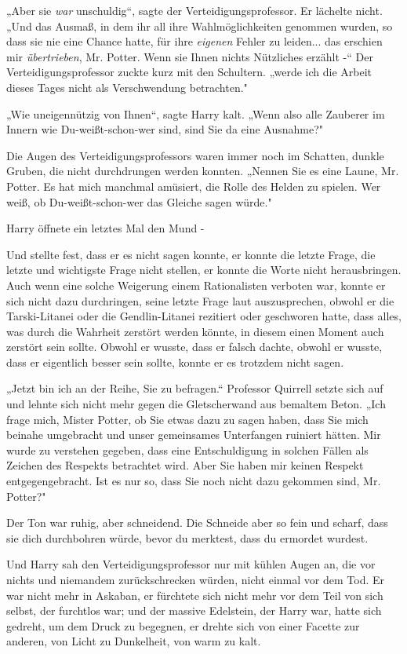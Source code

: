 {„Aber sie \emph{war} unschuldig“, sagte der Verteidigungsprofessor. Er lächelte nicht. „Und das Ausmaß, in dem ihr all ihre Wahlmöglichkeiten genommen wurden, so dass sie nie eine Chance hatte, für ihre \emph{eigenen} Fehler zu leiden... das erschien mir \emph{übertrieben}, Mr. Potter. Wenn sie Ihnen nichts Nützliches erzählt -“ Der Verteidigungsprofessor zuckte kurz mit den Schultern. „werde ich die Arbeit dieses Tages nicht als Verschwendung betrachten."

„Wie uneigennützig von Ihnen“, sagte Harry kalt. „Wenn also alle Zauberer im Innern wie Du-weißt-schon-wer sind, sind Sie da eine Ausnahme?"

Die Augen des Verteidigungsprofessors waren immer noch im Schatten, dunkle Gruben, die nicht durchdrungen werden konnten. „Nennen Sie es eine Laune, Mr. Potter. Es hat mich manchmal amüsiert, die Rolle des Helden zu spielen. Wer weiß, ob Du-weißt-schon-wer das Gleiche sagen würde."

Harry öffnete ein letztes Mal den Mund -

Und stellte fest, dass er es nicht sagen konnte, er konnte die letzte Frage, die letzte und wichtigste Frage nicht stellen, er konnte die Worte nicht herausbringen. Auch wenn eine solche Weigerung einem Rationalisten verboten war, konnte er sich nicht dazu durchringen, seine letzte Frage laut auszusprechen, obwohl er die Tarski-Litanei oder die Gendlin-Litanei rezitiert oder geschworen hatte, dass alles, was durch die Wahrheit zerstört werden könnte, in diesem einen Moment auch zerstört sein sollte. Obwohl er wusste, dass er falsch dachte, obwohl er wusste, dass er eigentlich besser sein sollte, konnte er es trotzdem nicht sagen.

„Jetzt bin ich an der Reihe, Sie zu befragen.“ Professor Quirrell setzte sich auf und lehnte sich nicht mehr gegen die Gletscherwand aus bemaltem Beton. „Ich frage mich, Mister Potter, ob Sie etwas dazu zu sagen haben, dass Sie mich beinahe umgebracht und unser gemeinsames Unterfangen ruiniert hätten. Mir wurde zu verstehen gegeben, dass eine Entschuldigung in solchen Fällen als Zeichen des Respekts betrachtet wird. Aber Sie haben mir keinen Respekt entgegengebracht. Ist es nur so, dass Sie noch nicht dazu gekommen sind, Mr. Potter?"

Der Ton war ruhig, aber schneidend. Die Schneide aber so fein und scharf, dass sie dich durchbohren würde, bevor du merktest, dass du ermordet wurdest.

Und Harry sah den Verteidigungsprofessor nur mit kühlen Augen an, die vor nichts und niemandem zurückschrecken würden, nicht einmal vor dem Tod. Er war nicht mehr in Askaban, er fürchtete sich nicht mehr vor dem Teil von sich selbst, der furchtlos war; und der massive Edelstein, der Harry war, hatte sich gedreht, um dem Druck zu begegnen, er drehte sich von einer Facette zur anderen, von Licht zu Dunkelheit, von warm zu kalt.

}
